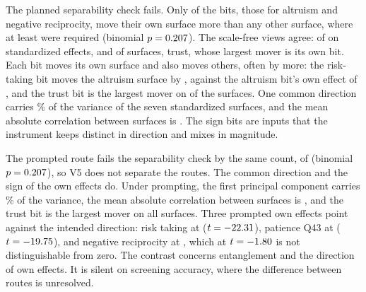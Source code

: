The planned separability check fails. Only  of the  bits, those for altruism and negative reciprocity, move their own surface more than any other surface, where at least  were required (binomial $p=\cl{0.207}{FX_adapter64_V5_p_binomial}$). The scale-free views agree:  of  on standardized effects, and  of  surfaces, trust, whose largest mover is its own bit. Each bit moves its own surface and also moves others, often by more: the risk-taking bit moves the altruism surface by , against the altruism bit's own effect of , and the trust bit is the largest mover on  of the  surfaces. One common direction carries \% of the variance of the seven standardized surfaces, and the mean absolute correlation between surfaces is . The sign bits are inputs that the instrument keeps distinct in direction and mixes in magnitude.

The prompted route fails the separability check by the same count,  of  (binomial $p=\cl{0.207}{FX_signprompt64_V5_p_binomial}$), so V5 does not separate the routes. The common direction and the sign of the own effects do. Under prompting, the first principal component carries \% of the variance, the mean absolute correlation between surfaces is , and the trust bit is the largest mover on all  surfaces. Three prompted own effects point against the intended direction: risk taking at  ($t=\cl{-22.31}{FX_signprompt64_risktaking_own_t}$), patience Q43 at  ($t=\cl{-19.75}{FX_signprompt64_patience_Q43_own_t}$), and negative reciprocity at , which at $t=\cl{-1.80}{FX_signprompt64_negrecip_own_t}$ is not distinguishable from zero. The contrast concerns entanglement and the direction of own effects. It is silent on screening accuracy, where the difference between routes is unresolved.

